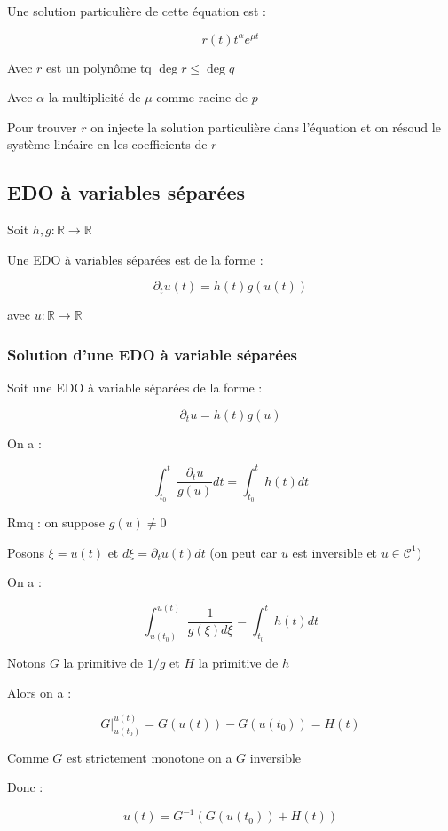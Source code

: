 \documentclass[a4paper,10pt]{article}
\newcommand{\ap}{\rightarrow}
\newcommand{\R}{\mathbb{R}}
\newcommand{\eqdo}{EDO }
\begin{document}
Une solution particulière de cette équation est :

$$r(t) t^\alpha e^{\mu t}$$

Avec $r$ est un polynôme tq $\deg r \leq \deg q$

Avec $\alpha$ la multiplicité de $\mu$ comme racine de $p$

Pour trouver $r$ on injecte la solution particulière dans l'équation et on résoud le système linéaire en les coefficients de $r$

\subsection{EDO à variables séparées}

Soit $h,g : \R \ap \R$

Une EDO à variables séparées est de la forme :

$$\partial_t u(t) = h(t) g(u(t))$$

avec $u : \R \ap \R$


\subsubsection{Solution d'une \eqdo à variable séparées}

Soit une \eqdo à variable séparées de la forme :

$$\partial_t u = h(t) g(u)$$

On a :

$$\int_{t_0}^t \frac{\partial_t u}{g(u)} dt = \int_{t_0}^t h(t) dt$$

Rmq : on suppose $g(u) \neq 0$

Posons $\xi = u(t)$ et $d \xi = \partial_t u(t) dt$ (on peut car $u$ est inversible et $u \in \mathcal{C}^1$)

On a :

$$\int_{u(t_0)}^{u(t)} \frac{1}{g(\xi) d \xi} = \int_{t_0}^t h(t) dt$$

Notons $G$ la primitive de $1/g$ et $H$ la primitive de $h$

Alors on a :

$$G \vert_{u(t_0)}^{u(t)} = G(u(t)) - G(u(t_0)) = H(t)$$

Comme $G$ est strictement monotone on a $G$ inversible

Donc :

$$u(t) = G^{-1}(G(u(t_0)) + H(t))$$


\end{document}
